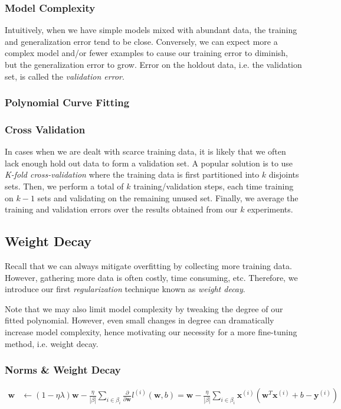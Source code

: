 \documentclass[a4paper,12pt]{article}
\theoremstyle{definition}
\begin{document}
\subsubsection*{Model Complexity}
Intuitively, when we have simple models mixed with abundant data, the training and generalization error tend to be close.
Conversely, we can expect more a complex model and/or fewer examples to cause our training error to diminish, but the
generalization error to grow. Error on the holdout data, i.e. the validation set, is called the \textit{validation error}.

\subsubsection*{Polynomial Curve Fitting}
\subsubsection*{Cross Validation}
In cases when we are dealt with scarce training data, it is likely that we often lack enough hold out data to form a validation
set. A popular solution is to use \textit{K-fold cross-validation} where the training data is first partitioned into $k$ disjoints
sets. Then, we perform a total of $k$ training/validation steps, each time training on $k-1$ sets and validating on the remaining unused set.
Finally, we average the training and validation errors over the results obtained from our $k$ experiments.
\subsection*{Weight Decay}
Recall that we can always mitigate overfitting by collecting more training data. However, gathering more data is often costly, time consuming,
etc. Therefore, we introduce our first \textit{regularization} technique known as \textit{weight decay}.

Note that we may also limit model complexity by tweaking the degree of our fitted polynomial. However, even small
changes in degree can dramatically increase model complexity, hence motivating our necessity for a more fine-tuning method, i.e. weight decay.

\subsubsection*{Norms \& Weight Decay}
\begin{equation*}
    \begin{aligned}
        \mathbf{w} & \leftarrow (1-\eta\lambda)\mathbf{w} - \frac{\eta}{|\beta|}\sum_{i\in\beta_i}\frac{\partial}{\partial\mathbf{w}}l^{(i)}(\mathbf{w},b) = \mathbf{w}- \frac{\eta}{|\beta|}\sum_{i\in\beta_i}\mathbf{x}^{(i)}(\mathbf{w}^T\mathbf{x}^{(i)} + b - \mathbf{y}^{(i)}) \\
    \end{aligned}
\end{equation*}
\end{document}
